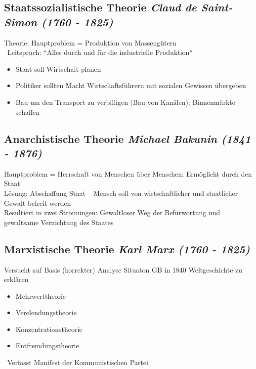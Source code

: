 \documentclass{report}
\begin{document}
\subsection{Staatssozialistische Theorie \rm{\textit{Claud de Saint-Simon (1760 - 1825)}}}
Theorie: Hauptproblem = Produktion von Massengütern\\
\arrow~Leitspruch: ``Alles durch und für die industrielle Produktion``
\begin{itemize}
	\item Staat soll Wirtschaft planen
	\item Politiker sollten Macht Wirtschaftsführern mit sozialen Gewissen übergeben
	\item Bau um den Transport zu verbilligen (Bau von Kanälen); Binnenmärkte schaffen
\end{itemize}

\subsection{Anarchistische Theorie \rm{\textit{Michael Bakunin (1841 - 1876)}}}
Hauptproblem = Herrschaft von Menschen über Menschen; Ermöglicht durch den Staat\\
Lösung: Abschaffung Staat \arrow~ Mensch soll von wirtschaftlicher und staatlicher Gewalt befreit werden\\
Resultiert in zwei Strömungen: Gewaltloser Weg der Befürwortung und gewaltsame Vernichtung des Staates

\subsection{Marxistische Theorie \rm{\textit{Karl Marx (1760 - 1825)}}}
Versucht auf Basis (korrekter) Analyse Situaton GB in 1840 Weltgeschichte zu erklären
\begin{itemize}
	\item Mehrwerttheorie
	\item Verelendungstheorie
	\item Konzentrationstheorie
	\item Entfremdungstheorie
\end{itemize}
\arrow~Verfasst Manifest der Kommunistischen Partei
\end{document}
